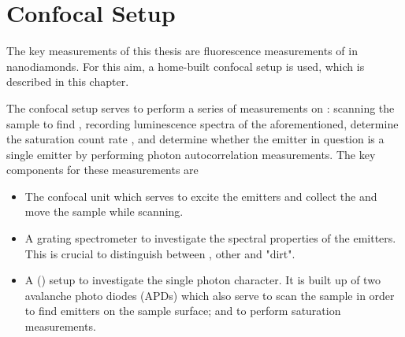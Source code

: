 
\chapter{Confocal Setup}	\label{ch::methods_confocal}

	The key measurements of this thesis are fluorescence measurements of \sivs in nanodiamonds.
	For this aim, a home-built confocal setup is used, which is described in this chapter.

	The confocal setup serves to perform a series of measurements on \fl: scanning the sample to find \sivs, recording luminescence spectra of the aforementioned, determine the saturation count rate , and determine whether the emitter in question is a single emitter by performing photon autocorrelation measurements.
	The key components for these measurements are 

	\begin{itemize}
		\item The confocal unit which serves to excite the emitters and collect the \fl and move the sample while scanning.
		\item A grating spectrometer to investigate the spectral properties of the emitters. This is crucial to distinguish between \sivs, other \ccs and "dirt".
		\item A \keyword{\HBT} (\hbt) setup to investigate the single photon character. It is built up of two avalanche photo diodes (APDs) which also serve to scan the sample in order to find emitters on the sample surface; and to perform saturation measurements.
	\end{itemize}

